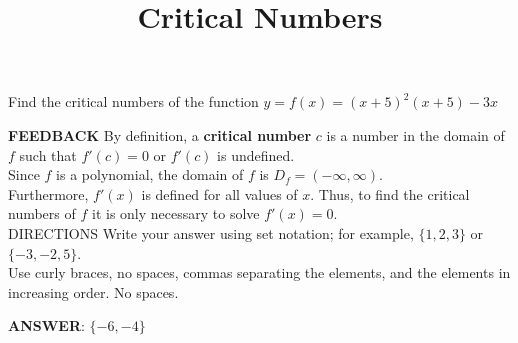 \documentclass{ximera}
\title{Critical Numbers}
\begin{document}

 Find the critical numbers of the function  \(\displaystyle   y = f(x) = (x+5)^2\left(x+5\right)-3x\)
	  
\textbf{FEEDBACK} 	By definition, a \textbf{critical number} \(c\) is a number in the domain of \(f\) such that \(f'(c)=0\) or     \(f'(c)\) is undefined.  
\\Since \(f\) is a polynomial, the domain of \(f\) is \( D_f = (-\infty, \infty)\).   
\\Furthermore, \(f'(x)\) is defined for all values of \(x\). Thus, to find the critical numbers of \(f\) it is only necessary to solve \(f'(x)=0\). 	  \\DIRECTIONS   	Write your answer using set notation; for example, \(\{1,2,3\}\) or \(\{-3,-2,5\}\).  
\\ Use curly braces, no spaces, commas separating the elements, and the elements in increasing order. No spaces.

\textbf{ANSWER}:  	\(\{-6,-4\}\)
\end{document}
